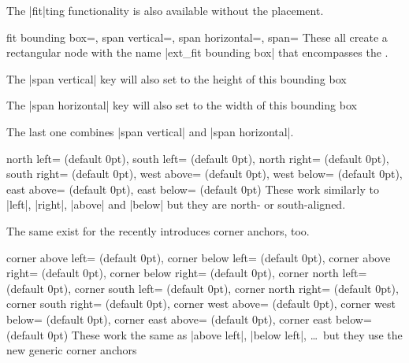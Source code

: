 \begin{multicols}{2}
\newcolumn
The |fit|ting functionality is also available without the placement.
\begin{keylist}[/\tikzext]{%
  fit bounding box=,
  span vertical=,
  span horizontal=,
  span=}
These all create a rectangular node with the name |ext_fit bounding box|
that encompasses the .

The |span vertical| key will also set 
to the height of this bounding box

The |span horizontal| key will also set 
to the width of this bounding box

The last one combines |span vertical| and |span horizontal|.
\end{keylist}

\begin{keylist}[/\tikzext]{%
  north  left= (default 0pt),
  south  left= (default 0pt),
  north right= (default 0pt),
  south right= (default 0pt),
  west  above= (default 0pt),
  west  below= (default 0pt),
  east  above= (default 0pt),
  east  below= (default 0pt)%
}
  These work similarly to |left|, |right|, |above| and |below|
  but they are north- or south-aligned.

\begin{codeexample}[preamble=\usetikzlibrary{ext.positioning-plus}]
\end{codeexample}
\end{keylist}

The same exist for the recently introduces corner anchors, too.
\begin{keylist}[/\tikzext]{%
  corner above left= (default 0pt),
  corner below left= (default 0pt),
  corner above right= (default 0pt),
  corner below right= (default 0pt),
  corner north  left= (default 0pt),
  corner south  left= (default 0pt),
  corner north right= (default 0pt),
  corner south right= (default 0pt),
  corner west  above= (default 0pt),
  corner west  below= (default 0pt),
  corner east  above= (default 0pt),
  corner east  below= (default 0pt)%
}
  These work the same as |above left|, |below left|, \dots\ 
  but they use the new generic corner anchors
\end{keylist}
\end{multicols}
\endinput






